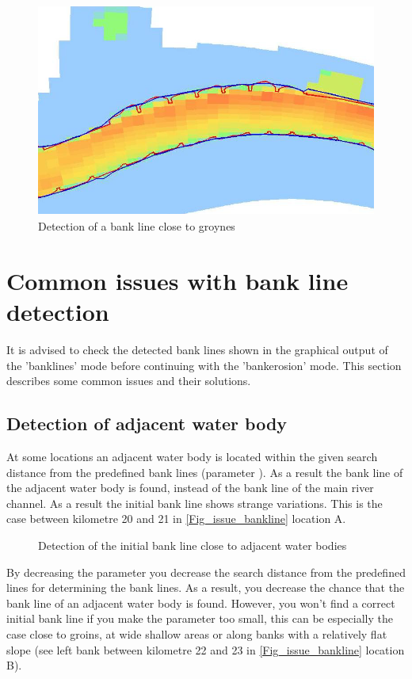 \begin{figure}[!hb]
\includegraphics[width=\textwidth,height=7cm]{figures/Fig3-3.png}
\caption{Detection of a bank line close to groynes}
\label{Fig3.3}
\vspace{-0.75cm} 
\end{figure}
\clearpage

\section{Common issues with bank line detection} \label{Sec:DetectIssues}
It is advised to check the detected bank lines shown in the graphical output of the 'banklines' mode before continuing with the 'bankerosion' mode.
This section describes some common issues and their solutions.

\subsection{Detection of adjacent water body}
At some locations an adjacent water body is located within the given search distance from the predefined bank lines (parameter ).
As a result the bank line of the adjacent water body is found, instead of the bank line of the main river channel.
As a result the initial bank line shows strange variations.
This is the case between kilometre 20 and 21 in \autoref{Fig_issue_bankline} location A.

\begin{figure}[!hb]
	\center
	\resizebox{15cm}{!}{
		
	}
	\caption{Detection of the initial bank line close to adjacent water bodies}
	\label{Fig_issue_bankline}
\end{figure}

By decreasing the parameter  you decrease the search distance from the predefined lines for determining the bank lines.
As a result, you decrease the chance that the bank line of an adjacent water  body is found.
However, you won't find a correct initial bank line if you make the parameter  too small, this can be especially the case close to groins, at wide shallow areas or along banks with a relatively flat slope (see left bank between kilometre 22 and 23 in \autoref{Fig_issue_bankline} location B).

